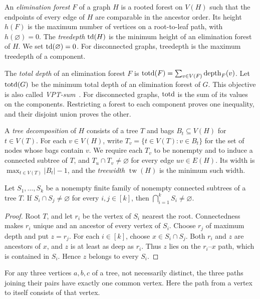 An \emph{elimination forest} $F$ of a graph $H$ is a rooted forest on
$V(H)$ such that the endpoints of every edge of $H$ are comparable in
the ancestor order. Its height $h(F)$ is the maximum number of vertices on a
root-to-leaf path, with $h(\varnothing)=0$. The \emph{treedepth}
$\operatorname{td}(H)$ is the minimum height of an elimination forest of $H$.
We set $\operatorname{td}(\varnothing)=0$. For
disconnected graphs, treedepth is the maximum treedepth of a component.

The \emph{total depth} of an elimination forest $F$ is
$\operatorname{totd}(F)=\sum_{v\in V(F)}\operatorname{depth}_F(v)$.
Let $\operatorname{totd}(G)$ be the minimum total depth of an
elimination forest of $G$. This objective is also called
\emph{VPT-sum}~\cite{HogemoEtAl2021}. For disconnected graphs,
$\operatorname{totd}$ is the sum of its values on the components. Restricting a forest
to each component proves one inequality, and their disjoint union
proves the other.

A \emph{tree decomposition} of $H$ consists of a tree $T$ and bags
$B_t\subseteq V(H)$ for $t\in V(T)$. For each $v\in V(H)$, write
$T_v=\{t\in V(T):v\in B_t\}$ for the set of nodes whose bags contain
$v$. We require each $T_v$ to be nonempty and to induce a connected
subtree of $T$, and $T_u\cap T_v\ne\varnothing$ for every edge
$uv\in E(H)$. Its width is
$\max_{t\in V(T)}|B_t|-1$, and the \emph{treewidth} $\operatorname{tw}(H)$ is
the minimum such width.

\begin{lemma}
\label{lem:subtree-helly}
Let $S_1,\ldots,S_k$ be a nonempty finite family of nonempty
connected subtrees of a tree $T$. If $S_i\cap S_j\ne\varnothing$
for every $i,j\in[k]$, then $\bigcap_{i=1}^k S_i\ne\varnothing$.
\end{lemma}

\begin{proof}
Root $T$, and let $r_i$ be the vertex of $S_i$ nearest the root.
Connectedness makes $r_i$ unique and an ancestor of every vertex
of $S_i$. Choose $r_j$ of maximum depth and put $z=r_j$.
For each $i\in[k]$, choose $x\in S_i\cap S_j$. Both $r_i$ and $z$ are
ancestors of $x$, and $z$ is at least as deep as $r_i$. Thus $z$
lies on the $r_i$--$x$ path, which is contained in $S_i$.
Hence $z$ belongs to every $S_i$.
\end{proof}

\begin{lemma}
\label{lem:three-tree-paths}
For any three vertices $a,b,c$ of a tree, not necessarily distinct,
the three paths joining their pairs have exactly one common vertex.
Here the path from a vertex to itself consists of that vertex.
\end{lemma}

